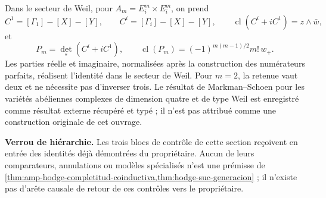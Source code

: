 Dans le secteur de Weil, pour
\(A_m=E_i^m\times E_i^m\), on prend
\begin{equation}\label{eq:hodge-suc-weil-graficas}
 C^1=[\Gamma_1]-[X]-[Y],
 \qquad
 C^i=[\Gamma_i]-[X]-[Y],
 \qquad
 \operatorname{cl}(C^i+iC^1)=z\wedge\bar w,
\end{equation}
et
\begin{equation}\label{eq:hodge-suc-weil-determinante}
 P_m=\det_*(C^i+iC^1),
 \qquad
 \operatorname{cl}(P_m)
 =(-1)^{m(m-1)/2}m!\,w_+.
\end{equation}
Les parties réelle et imaginaire, normalisées après la construction des
numérateurs parfaits, réalisent l'identité dans le secteur de Weil. Pour
\(m=2\), la retenue vaut deux et ne nécessite pas d'inverser trois. Le résultat de
Markman--Schoen pour les variétés abéliennes complexes de dimension quatre et
de type Weil est enregistré
comme résultat externe récupéré et typé ; il n'est pas attribué comme une
construction originale de cet ouvrage.

\noindent\textbf{Verrou de hiérarchie.}
Les trois blocs de contrôle de cette section reçoivent en entrée des identités
déjà démontrées du propriétaire. Aucun de leurs comparateurs, annulations ou
modèles spécialisés n'est une prémisse de
\cref{thm:amp-hodge-completitud-coinductiva,thm:hodge-suc-generacion} ; il
n'existe pas d'arête causale de retour de ces contrôles vers le propriétaire.
